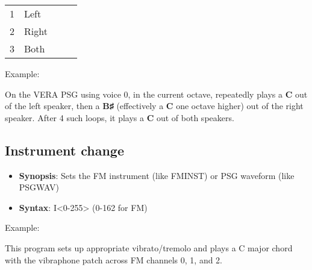 \vspace{16pt}

\begin{tabular}{l p{0.8\linewidth}}
	1 & Left\\
	2 & Right\\
	3 & Both\\
\end{tabular}

\vspace{16pt}

Example:\\


On the VERA PSG using voice 0, in the current octave, repeatedly plays a
{\ttfamily\bfseries C} out of the left speaker, then a {\ttfamily\bfseries B♯}
(effectively a {\ttfamily\bfseries C} one octave higher) out of the right
speaker.  After 4 such loops, it plays a {\ttfamily\bfseries C} out of both
speakers.\\

\subsection{Instrument change}

\begin{itemize}

	\item {\bfseries Synopsis}: Sets the FM instrument (like FMINST) or PSG waveform (like PSGWAV)

	\item {\bfseries Syntax}: {\ttfamily I<0-255>} (0-162 for FM)

\end{itemize}

\vspace{16pt}

Example:\\


This program sets up appropriate vibrato/tremolo and plays a C major chord with
the vibraphone patch across FM channels 0, 1, and 2.
